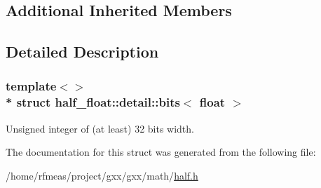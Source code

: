 \subsection*{Additional Inherited Members}


\subsection{Detailed Description}
\subsubsection*{template$<$$>$\\*
struct half\+\_\+float\+::detail\+::bits$<$ float $>$}

Unsigned integer of (at least) 32 bits width. 

The documentation for this struct was generated from the following file\+:\begin{DoxyCompactItemize}
\item 
/home/rfmeas/project/gxx/gxx/math/\hyperlink{half_8h}{half.\+h}\end{DoxyCompactItemize}
